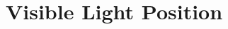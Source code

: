\documentclass{sig-alternate}
\begin{document}
%

\title{Visible Light Position}
%
%
%
%
%
\end{document}
